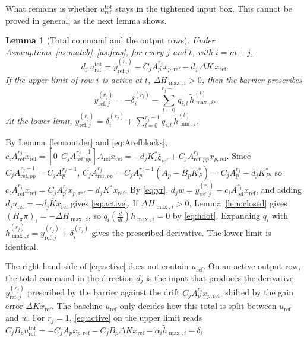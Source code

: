 \documentclass[lettersize,journal]{IEEEtran}
\newtheorem{lemma}{Lemma}
\newcommand{\Kh}{\hat{K}}
\newcommand{\xr}{x_{\mathrm{ref}}}
\newcommand{\xpr}{x_{p,\mathrm{ref}}}
\newcommand{\Ar}{A_{\mathrm{ref}}}
\newcommand{\App}{A_{\mathrm{ref},pp}}
\newcommand{\uref}{u_{\mathrm{ref}}}
\newcommand{\utot}{u_{\mathrm{ref}}^{\mathrm{tot}}}
\begin{document}
What remains is whether $\utot$ stays in the tightened input box. This cannot be proved in general, as the next lemma shows.

\begin{lemma}[Total command and the output rows] \label{lem:active}
Under Assumptions~\ref{as:match}--\ref{as:feas}, for every $j$ and $t$, with $i=m+j$,
\begin{equation}
d_j\,\utot = y^{(r_j)}_{\mathrm{ref},j} - C_jA_p^{r_j}\xpr - d_j\,\Delta K\,\xr. \label{eq:active}
\end{equation}
If the upper limit of row $i$ is active at $t$, $\Delta H_{\max,i}>0$, then the barrier prescribes
\begin{equation*}
y^{(r_j)}_{\mathrm{ref},j}=-\delta_i^{(r_j)}-\sum_{l=0}^{r_j-1}q_{i,l}\,\tilde h_{\max,i}^{(l)}.
\end{equation*}
At the lower limit, $y^{(r_j)}_{\mathrm{ref},j}=\delta_i^{(r_j)}+\sum_{l=0}^{r_j-1}q_{i,l}\,\tilde h_{\min,i}^{(l)}$.
\end{lemma}
\begin{IEEEproof}
By Lemma~\ref{lem:outder} and \eqref{eq:Arefblocks}, $c_i\Ar^{r_j}\xr=[0\ \ C_j\App^{r_j-1}]\Ar\xr=-d_jK_I^*\xi_{\mathrm{ref}}+C_j\App^{r_j}\xpr$. Since $C_j\App^{r_j-1}=C_jA_p^{r_j-1}$, $C_j\App^{r_j}=C_jA_p^{r_j-1}(A_p-B_pK_P^*)=C_jA_p^{r_j}-d_jK_P^*$, so $c_i\Ar^{r_j}\xr=C_jA_p^{r_j}\xpr-d_jK^*\xr$. By \eqref{eq:yr}, $d_jw=y^{(r_j)}_{\mathrm{ref},j}-c_i\Ar^{r_j}\xr$, and adding $d_j\uref=-d_j\Kh\xr$ gives \eqref{eq:active}. If $\Delta H_{\max,i}>0$, Lemma~\ref{lem:closed} gives $(H_\pi\pi)_i=-\Delta H_{\max,i}$, so $q_i(\frac{d}{dt})\tilde h_{\max,i}=0$ by \eqref{eq:hdot}. Expanding $q_i$ with $\tilde h_{\max,i}^{(r_j)}=y^{(r_j)}_{\mathrm{ref},j}+\delta_i^{(r_j)}$ gives the prescribed derivative. The lower limit is identical.
\end{IEEEproof}

The right-hand side of \eqref{eq:active} does not contain $\uref$. On an active output row, the total command in the direction $d_j$ is the input that produces the derivative $y^{(r_j)}_{\mathrm{ref},j}$ prescribed by the barrier against the drift $C_jA_p^{r_j}\xpr$, shifted by the gain error $\Delta K\xr$. The baseline $\uref$ only decides how this total is split between $\uref$ and $w$. For $r_j=1$, \eqref{eq:active} on the upper limit reads $C_jB_p\utot=-C_jA_p\xpr-C_jB_p\Delta K\xr-\alpha_i\tilde h_{\max,i}-\dot\delta_i$.
\end{document}
